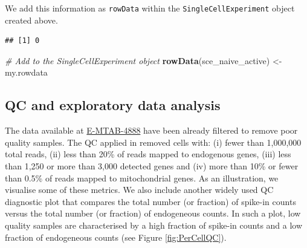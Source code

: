 \documentclass[9pt,a4paper,]{extarticle}
\newenvironment{Shaded}{\begin{snugshade}}{\end{snugshade}}
\newcommand{\CommentTok}[1]{\textcolor[rgb]{0.56,0.35,0.01}{\textit{#1}}}
\newcommand{\DataTypeTok}[1]{\textcolor[rgb]{0.13,0.29,0.53}{#1}}
\newcommand{\KeywordTok}[1]{\textcolor[rgb]{0.13,0.29,0.53}{\textbf{#1}}}
\newcommand{\NormalTok}[1]{#1}
\newcommand{\OperatorTok}[1]{\textcolor[rgb]{0.81,0.36,0.00}{\textbf{#1}}}
\newcommand{\OtherTok}[1]{\textcolor[rgb]{0.56,0.35,0.01}{#1}}
\newcommand{\StringTok}[1]{\textcolor[rgb]{0.31,0.60,0.02}{#1}}
\begin{document}
We add this information as \texttt{rowData} within the \texttt{SingleCellExperiment}
object created above.

\begin{Shaded}
\end{Shaded}

\begin{verbatim}
## [1] 0
\end{verbatim}

\begin{Shaded}
\begin{Highlighting}[]
\CommentTok{# Add to the SingleCellExperiment object}
\KeywordTok{rowData}\NormalTok{(sce_naive_active) <-}\StringTok{ }\NormalTok{my.rowdata}
\end{Highlighting}
\end{Shaded}

\hypertarget{qc-and-exploratory-data-analysis-1}{%
\subsection{QC and exploratory data analysis}\label{qc-and-exploratory-data-analysis-1}}

The data available at
\href{https://www.ebi.ac.uk/arrayexpress/experiments/E-MTAB-4888/}{E-MTAB-4888} have
been already filtered to remove poor quality samples.
The QC applied in \citep{Martinez-jimenez2017} removed cells with: (i) fewer
than 1,000,000 total reads, (ii) less than 20\% of reads mapped to
endogenous genes, (iii) less than 1,250 or more than 3,000 detected genes and
(iv) more than 10\% or fewer than 0.5\% of reads mapped to mitochondrial genes.
As an illustration, we visualise some of these metrics.
We also include another widely used QC diagnostic plot that compares the total
number (or fraction) of spike-in counts versus the total number (or fraction) of
endogeneous counts.
In such a plot, low quality samples are characterised by a high fraction of
spike-in counts and a low fraction of endogeneous counts
(see Figure \ref{fig:PerCellQC}).
\end{document}
